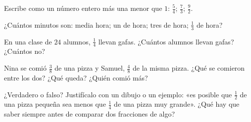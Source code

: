\begin{exercise}[$\star$]\label{exo:g4:fractions:7}
Escribe como un número entero más una  menor que $1$:
$\frac54$; \quad $\frac73$; \quad $\frac{9}{2}$.
\end{exercise}

\begin{exercise}[$\star$]\label{exo:g4:fractions:8}
¿Cuántos minutos son: media hora; un  de hora; tres
 de hora; $\frac13$ de hora?
\end{exercise}

\begin{exercise}[$\star$]\label{exo:g4:fractions:9}
En una clase de $24$ alumnos, $\frac14$ llevan gafas. ¿Cuántos
alumnos llevan gafas? ¿Cuántos no?
\end{exercise}

\begin{exercise}[$\star\star$]\label{exo:g4:fractions:10}
Nina se comió $\frac38$ de una pizza y Samuel, $\frac48$ de la misma
pizza. ¿Qué  se comieron entre los dos? ¿Qué  queda?
¿Quién comió más?
\end{exercise}

\begin{exercise}[$\star\star$]\label{exo:g4:fractions:11}
¿Verdadero o falso? Justifícalo con un dibujo o un ejemplo: «es posible que
$\frac12$ de una pizza pequeña sea menos que $\frac14$ de una pizza muy grande».
¿Qué hay que saber siempre antes de comparar dos fracciones de
algo?
\end{exercise}

